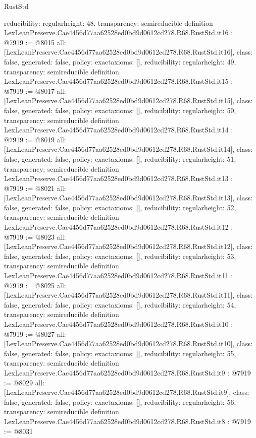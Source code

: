 \begin{lexlean}{RustStd}
\begin{coremodule}
{  reducibility: regular{height: 48},
  transparency: semireducible
}
definition LexLeanPreserve.Cae4456d77aa62528ed0bd9d0612cd278.R68.RustStd.it16 : @7919 := @8015 {
  all: [LexLeanPreserve.Cae4456d77aa62528ed0bd9d0612cd278.R68.RustStd.it16],
  class: false,
  generated: false,
  policy: exact{axioms: []},
  reducibility: regular{height: 49},
  transparency: semireducible
}
definition LexLeanPreserve.Cae4456d77aa62528ed0bd9d0612cd278.R68.RustStd.it15 : @7919 := @8017 {
  all: [LexLeanPreserve.Cae4456d77aa62528ed0bd9d0612cd278.R68.RustStd.it15],
  class: false,
  generated: false,
  policy: exact{axioms: []},
  reducibility: regular{height: 50},
  transparency: semireducible
}
definition LexLeanPreserve.Cae4456d77aa62528ed0bd9d0612cd278.R68.RustStd.it14 : @7919 := @8019 {
  all: [LexLeanPreserve.Cae4456d77aa62528ed0bd9d0612cd278.R68.RustStd.it14],
  class: false,
  generated: false,
  policy: exact{axioms: []},
  reducibility: regular{height: 51},
  transparency: semireducible
}
definition LexLeanPreserve.Cae4456d77aa62528ed0bd9d0612cd278.R68.RustStd.it13 : @7919 := @8021 {
  all: [LexLeanPreserve.Cae4456d77aa62528ed0bd9d0612cd278.R68.RustStd.it13],
  class: false,
  generated: false,
  policy: exact{axioms: []},
  reducibility: regular{height: 52},
  transparency: semireducible
}
definition LexLeanPreserve.Cae4456d77aa62528ed0bd9d0612cd278.R68.RustStd.it12 : @7919 := @8023 {
  all: [LexLeanPreserve.Cae4456d77aa62528ed0bd9d0612cd278.R68.RustStd.it12],
  class: false,
  generated: false,
  policy: exact{axioms: []},
  reducibility: regular{height: 53},
  transparency: semireducible
}
definition LexLeanPreserve.Cae4456d77aa62528ed0bd9d0612cd278.R68.RustStd.it11 : @7919 := @8025 {
  all: [LexLeanPreserve.Cae4456d77aa62528ed0bd9d0612cd278.R68.RustStd.it11],
  class: false,
  generated: false,
  policy: exact{axioms: []},
  reducibility: regular{height: 54},
  transparency: semireducible
}
definition LexLeanPreserve.Cae4456d77aa62528ed0bd9d0612cd278.R68.RustStd.it10 : @7919 := @8027 {
  all: [LexLeanPreserve.Cae4456d77aa62528ed0bd9d0612cd278.R68.RustStd.it10],
  class: false,
  generated: false,
  policy: exact{axioms: []},
  reducibility: regular{height: 55},
  transparency: semireducible
}
definition LexLeanPreserve.Cae4456d77aa62528ed0bd9d0612cd278.R68.RustStd.it9 : @7919 := @8029 {
  all: [LexLeanPreserve.Cae4456d77aa62528ed0bd9d0612cd278.R68.RustStd.it9],
  class: false,
  generated: false,
  policy: exact{axioms: []},
  reducibility: regular{height: 56},
  transparency: semireducible
}
definition LexLeanPreserve.Cae4456d77aa62528ed0bd9d0612cd278.R68.RustStd.it8 : @7919 := @8031 {
}
\end{coremodule}
\end{lexlean}
